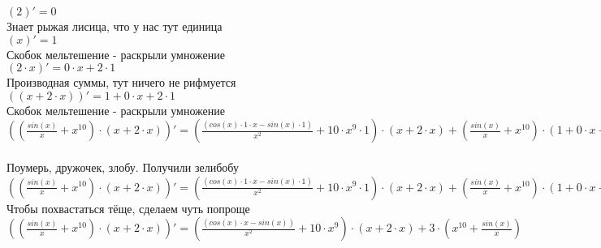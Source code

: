\documentclass[a4paper,12pt]{article}
\begin{document}
\begin{math}
	(2)' = 0
\end{math}\\
Знает рыжая лисица, что у нас тут единица\\
\begin{math}
	(x)' = 1
\end{math}\\
Скобок мельтешение - раскрыли умножение\\
\begin{math}
	(2 \cdot x)' = 0 \cdot x + 2 \cdot 1
\end{math}\\
Производная суммы, тут ничего не рифмуется\\
\begin{math}
	((x + 2 \cdot x))' = 1 + 0 \cdot x + 2 \cdot 1
\end{math}\\
Скобок мельтешение - раскрыли умножение\\
\begin{math}
	(( \frac{ sin (x) }{x}  + x ^{10} ) \cdot (x + 2 \cdot x))' = ( \frac{( cos (x)  \cdot 1 \cdot x -  sin (x)  \cdot 1)}{x ^{2} }  + 10 \cdot x ^{9}  \cdot 1) \cdot (x + 2 \cdot x) + ( \frac{ sin (x) }{x}  + x ^{10} ) \cdot (1 + 0 \cdot x + 2 \cdot 1)
\end{math}\\
\\Поумерь, дружочек, злобу. Получили зелибобу\\ $(( \frac{ sin (x) }{x}  + x ^{10} ) \cdot (x + 2 \cdot x))' = ( \frac{( cos (x)  \cdot 1 \cdot x -  sin (x)  \cdot 1)}{x ^{2} }  + 10 \cdot x ^{9}  \cdot 1) \cdot (x + 2 \cdot x) + ( \frac{ sin (x) }{x}  + x ^{10} ) \cdot (1 + 0 \cdot x + 2 \cdot 1)$\\
Чтобы похвастаться тёще, сделаем чуть попроще\\
$(( \frac{ sin (x) }{x}  + x ^{10} ) \cdot (x + 2 \cdot x))' = ( \frac{( cos (x)  \cdot x -  sin (x) )}{x ^{2} }  + 10 \cdot x ^{9} ) \cdot (x + 2 \cdot x) + 3 \cdot (x ^{10}  +  \frac{ sin (x) }{x} )$\\
\end{document}
